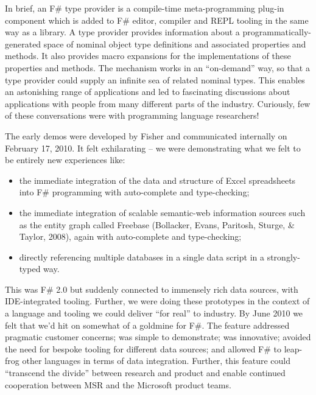 \documentclass[acmsmall,review]{acmart}\settopmatter{printfolios=true,printccs=false,printacmref=false}
\begin{document}
In brief, an F\# type provider is a compile-time meta-programming plug-in component which is added to F\# editor, compiler
and REPL tooling in the same way as a library. A type provider provides information about a programmatically-generated space
of nominal object type definitions and associated properties and methods.  It also provides macro expansions for the implementations
of these properties and methods. The mechanism works in an “on-demand” way, so that a type provider could supply an infinite
sea of related nominal types.  This enables an astonishing range of applications and led to fascinating discussions about applications
with people from many different parts of the industry.  Curiously, few of these conversations were with programming language researchers!

The early demos were developed by Fisher and communicated internally on February 17, 2010. It felt exhilarating – we were demonstrating
what we felt to be entirely new experiences like:


\begin{itemize}
\item the immediate integration of the data and structure of Excel spreadsheets into F\# programming with auto-complete and type-checking;
\item the immediate integration of scalable semantic-web information sources such as the entity graph called Freebase (Bollacker, Evans, Paritosh, Sturge, \& Taylor, 2008), again with auto-complete and type-checking;
\item directly referencing multiple databases in a single data script in a strongly-typed way.
\end{itemize}


This was F\# 2.0 but suddenly connected to immensely rich data sources, with IDE-integrated tooling.  Further, we were
doing these prototypes in the context of a language and tooling we could deliver “for real” to industry.  By June 2010 we
felt that we’d hit on somewhat of a goldmine for F\#. The feature addressed pragmatic customer concerns; was simple to
demonstrate; was innovative; avoided the need for bespoke tooling for different data sources; and allowed F\# to leap-frog
other languages in terms of data integration. Further, this feature could “transcend the divide” between research and product
and enable continued cooperation between MSR and the Microsoft product teams. 
\end{document}
